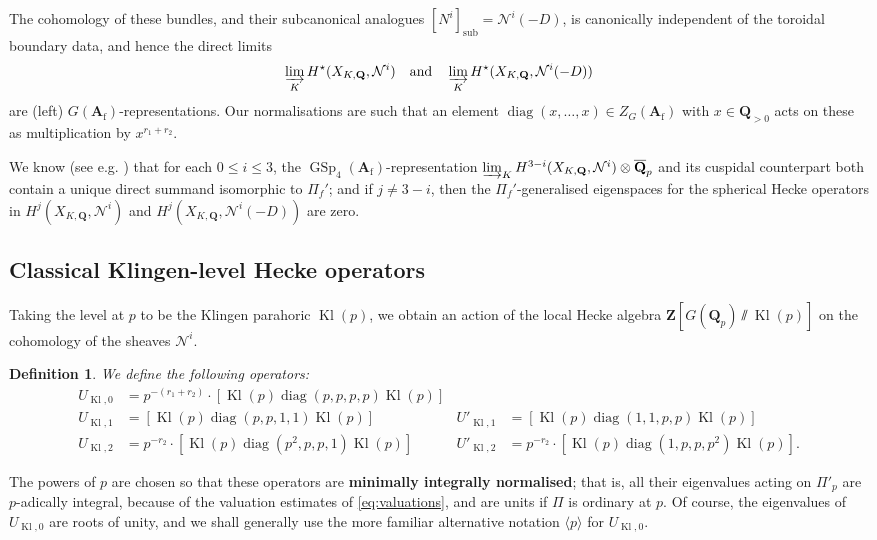 \documentclass[cjm]{ipart}
\theoremstyle{plain}
\newtheorem{definition}[theorem]{Definition}
\theoremstyle{remark}
\DeclareMathOperator{\diag}{diag}
\DeclareMathOperator{\GSp}{GSp}
\DeclareMathOperator{\Kl}{Kl}
\newcommand{\Af}{\AA_{\mathrm{f}}}
\newcommand{\QQbar}{\overline{\QQ}}
\newcommand{\QQ}{\mathbf{Q}}
\newcommand{\Qp}{\QQ_p}
\newcommand{\ZZ}{\mathbf{Z}}
\newcommand{\cN}{\mathcal{N}}
\renewcommand{\AA}{\mathbf{A}}
\numberwithin{equation}{subsection}
\renewcommand{\le}{\leqslant}
\begin{document}
  \begin{note}
   The cohomology of these bundles, and their subcanonical analogues $[N^i]_{\mathrm{sub}} = \cN^i(-D)$, is canonically independent of the toroidal boundary data, and hence the direct limits
   \[ 
    \varinjlim_K H^\star(X_{K, \QQ}, \cN^i)\quad\text{and}
    \quad \varinjlim_K H^\star(X_{K, \QQ}, \cN^i(-D))
   \]
   are (left) $G(\Af)$-representations. Our normalisations are such that an element $\diag(x, \dots, x) \in Z_G(\Af)$ with $x \in \QQ_{> 0}$ acts on these as multiplication by $x^{r_1 + r_2}$.

   We know (see e.g. \cite[Theorem 5.2]{LPSZ1}) that for each $0 \le i \le 3$, the $\GSp_4(\Af)$-representation $\varinjlim_K H^{3-i}(X_{K, \QQ}, \cN^i) \otimes \QQbar_p$ and its cuspidal counterpart both contain a unique direct summand isomorphic to $\Pi_f'$; and if $j \ne 3-i$, then the $\Pi_f'$-generalised eigenspaces for the spherical Hecke operators in $H^j(X_{K, \QQ}, \cN^i)$ and $H^j(X_{K, \QQ}, \cN^i(-D))$ are zero.
  \end{note}

 \subsection{Classical Klingen-level Hecke operators}

  Taking the level at $p$ to be the Klingen parahoric $\Kl(p)$, we obtain an action of the local Hecke algebra $\ZZ[G(\Qp) \sslash \Kl(p) ]$ on the cohomology of the sheaves $\cN^i$.

  \begin{definition}
   We define the following operators:
   \begin{align*}
    U_{\Kl, 0} &= p^{-(r_1 + r_2)} \cdot \left[ \Kl(p) \diag(p, p, p, p) \Kl(p)\right] \\
    U_{\Kl, 1} &= \left[\Kl(p) \diag(p, p, 1, 1) \Kl(p)\right] &
    U'_{\Kl, 1} &= \left[ \Kl(p) \diag(1, 1, p, p) \Kl(p)\right] \\
    U_{\Kl, 2} &= p^{-r_2} \cdot \left[ \Kl(p) \diag(p^2, p, p, 1) \Kl(p)\right] &
    U'_{\Kl, 2} &= p^{-r_2} \cdot \left[\Kl(p)\diag(1, p, p, p^2)\Kl(p)\right].
   \end{align*}
  \end{definition}

  \begin{remark}
   The powers of $p$ are chosen so that these operators are \textbf{minimally integrally normalised}; that is, all their eigenvalues acting on $\Pi'_p$ are $p$-adically integral, because of the valuation estimates of \cref{eq:valuations}, and are units if $\Pi$ is ordinary at $p$. Of course, the eigenvalues of $U_{\Kl, 0}$ are roots of unity, and we shall generally use the more familiar alternative notation $\langle p \rangle$ for $U_{\Kl, 0}$.
  \end{remark}
\end{document}
